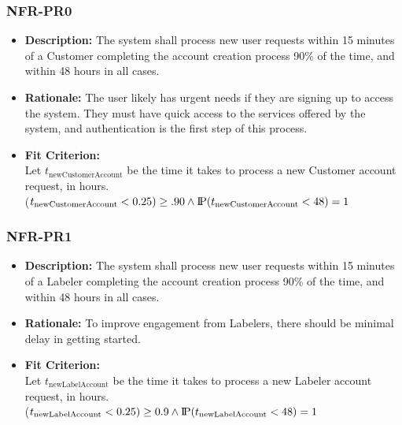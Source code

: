 \documentclass[12pt]{article}
\newcommand{\probP}{\text{I\kern-0.15em P}}
\begin{document}
\subsubsection*{NFR-PR0}
\begin{itemize}
  \item \textbf{Description:} The system shall process new user requests within 15 minutes of a Customer completing the account creation process 90\% of the time, and within 48 hours in all cases. 
  \item \textbf{Rationale:} The user likely has urgent needs if they are signing up to access the system. They must have quick access to the services offered by the system, and authentication is the first step of this process.
  \item \textbf{Fit Criterion:}\\ Let $t_{\text{newCustomerAccount}}$ be the time it takes to process a new Customer account request, in hours.\\ \probP($t_{\text{newCustomerAccount}} < 0.25) \geq .90 \wedge \probP(t_{\text{newCustomerAccount}} < 48) = 1 $
\end{itemize}

\subsubsection*{NFR-PR1}
\begin{itemize}
  \item \textbf{Description:} The system shall process new user requests within 15 minutes of a Labeler  completing the account creation process 90\% of the time, and within 48 hours in all cases. 
  \item \textbf{Rationale:} To improve engagement from Labelers, there should be minimal delay in getting started.
  \item \textbf{Fit Criterion:}\\ Let $t_{\text{newLabelAccount}}$ be the time it takes to process a new Labeler account request, in hours.\\ \probP($t_{\text{newLabelAccount}} < 0.25) \geq 0.9 \wedge \probP(t_{\text{newLabelAccount}} < 48) = 1 $
\end{itemize}
\end{document}
